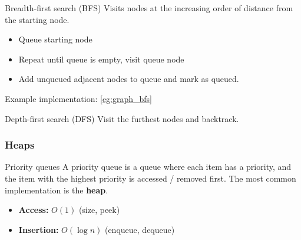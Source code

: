 \begin{theorem}
    {Breadth-first search (BFS)}
    Visits nodes at the increasing order of distance from the starting node.
    \begin{itemize}
        \item Queue starting node
        \item Repeat until queue is empty, visit queue node
        \item Add unqueued adjacent nodes to queue and mark as queued.
    \end{itemize}
    \tcblower
    Example implementation: \ref{eg:graph_bfs}
\end{theorem}

\label{thm:graph_bfs}

\begin{theorem}
    {Depth-first search (DFS)}
    Visit the furthest nodes and backtrack.
\end{theorem}



\subsubsection{Heaps}
\label{subsubsec:heaps}

\begin{theorem}
    {Priority queues}
    A priority queue is a queue where each item has a priority, and the item with the highest priority is accessed / removed first. The most common implementation is the \textbf{heap}.

    \begin{itemize}
        \item \textbf{Access:} $O(1)$ (size, peek)
        \item \textbf{Insertion:} $O(\log n)$ (enqueue, dequeue)
    \end{itemize}
\end{theorem}

